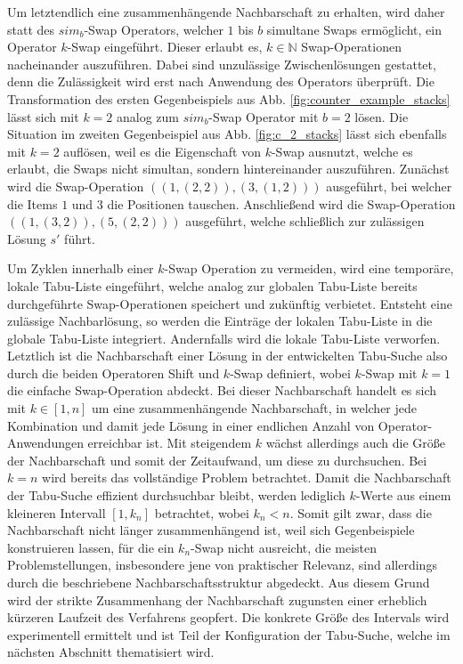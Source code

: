 Um letztendlich eine zusammenhängende Nachbarschaft zu erhalten, wird daher statt des $sim_b$-Swap Operators,
welcher $1$ bis $b$ simultane Swaps ermöglicht, ein Operator $k$-Swap eingeführt. Dieser erlaubt es, $k \in \mathbb{N}$
Swap-Operationen nacheinander auszuführen. Dabei sind unzulässige Zwischenlösungen gestattet, denn die Zulässigkeit
wird erst nach Anwendung des Operators überprüft. Die Transformation des ersten Gegenbeispiels aus Abb. \ref{fig:counter_example_stacks}
lässt sich mit $k = 2$ analog zum $sim_b$-Swap Operator mit $b = 2$ lösen.
Die Situation im zweiten Gegenbeispiel aus Abb. \ref{fig:c_2_stacks} lässt sich ebenfalls mit $k = 2$ auflösen,
weil es die Eigenschaft von $k$-Swap ausnutzt, welche es erlaubt, die Swaps nicht simultan, sondern hintereinander
auszuführen. Zunächst wird die Swap-Operation $((1, (2, 2)), (3, (1, 2)))$ ausgeführt, bei welcher die Items $1$ und $3$
die Positionen tauschen. Anschließend wird die Swap-Operation $((1, (3, 2)), (5, (2, 2)))$ ausgeführt,
welche schließlich zur zulässigen Lösung $s'$ führt.

Um Zyklen innerhalb einer $k$-Swap Operation zu vermeiden, wird eine temporäre, lokale Tabu-Liste eingeführt,
welche analog zur globalen Tabu-Liste bereits durchgeführte Swap-Operationen speichert und zukünftig verbietet.
Entsteht eine zulässige Nachbarlösung, so werden die Einträge der lokalen Tabu-Liste in die globale Tabu-Liste
integriert. Andernfalls wird die lokale Tabu-Liste verworfen.
Letztlich ist die Nachbarschaft einer Lösung in der entwickelten Tabu-Suche also durch die beiden Operatoren
Shift und  $k$-Swap definiert, wobei $k$-Swap mit $k = 1$ die einfache Swap-Operation abdeckt.
Bei dieser Nachbarschaft handelt es sich mit $k \in [1, n]$ um eine zusammenhängende Nachbarschaft, in
welcher jede Kombination und damit jede Lösung in einer endlichen Anzahl von Operator-Anwendungen erreichbar ist.
Mit steigendem $k$ wächst allerdings auch die Größe der Nachbarschaft und somit der Zeitaufwand, um diese zu durchsuchen.
Bei $k = n$ wird bereits das vollständige Problem betrachtet.
Damit die Nachbarschaft der Tabu-Suche effizient durchsuchbar bleibt, werden lediglich $k$-Werte aus einem kleineren Intervall
$[1, k_n]$ betrachtet, wobei $k_n < n$. Somit gilt zwar, dass die Nachbarschaft nicht länger zusammenhängend ist, weil sich Gegenbeispiele konstruieren lassen, für die ein $k_n$-Swap nicht ausreicht, die meisten Problemstellungen, insbesondere jene von praktischer Relevanz, sind allerdings durch die beschriebene Nachbarschaftsstruktur abgedeckt. Aus diesem Grund wird der strikte Zusammenhang der Nachbarschaft zugunsten einer erheblich kürzeren Laufzeit des Verfahrens geopfert. Die konkrete Größe des Intervals
wird experimentell ermittelt und ist Teil der Konfiguration der Tabu-Suche, welche im nächsten Abschnitt thematisiert wird.


